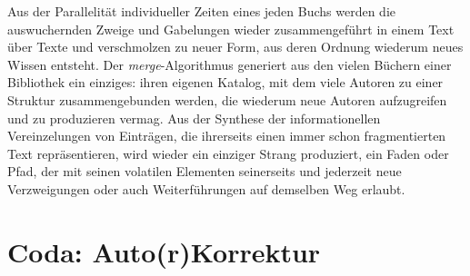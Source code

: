 \documentclass[a4paper,11pt]{article}
\begin{document}
Aus der Parallelität individueller Zeiten eines jeden Buchs werden die auswuchernden Zweige und Gabelungen wieder zusammengeführt in einem Text über Texte und verschmolzen zu neuer Form, aus deren Ordnung wiederum neues Wissen entsteht. Der  \emph{merge}-Algorithmus generiert aus den vielen Büchern einer Bibliothek ein einziges: ihren eigenen Katalog, mit dem viele Autoren zu einer Struktur zusammengebunden werden, die wiederum neue Autoren aufzugreifen und zu produzieren vermag. Aus der Synthese der informationellen Vereinzelungen von Einträgen, die ihrerseits einen immer schon fragmentierten Text repräsentieren, wird wieder ein einziger Strang produziert, ein Faden oder Pfad, der mit seinen volatilen Elementen seinerseits und jederzeit neue Verzweigungen oder auch Weiterführungen auf demselben Weg erlaubt.


\section*{Coda: Auto(r)Korrektur}

\begin{comment}

Autokorrektur für Software: Deep Coding:

https://www.republik.ch/2018/06/27/programmier-dich-doch-selbst

Delegation in Letter-Writing: \cite{blair:2016}

word2vec:
https://deeplearning4j.org/docs/latest/deeplearning4j-nlp-word2vec

https://github.com/deeplearning4j/dl4j-examples/blob/master/dl4j-examples/src/main/java/org/deeplearning4j/examples/nlp/word2vec/Word2VecRawTextExample.java

\end{comment}
\end{document}
